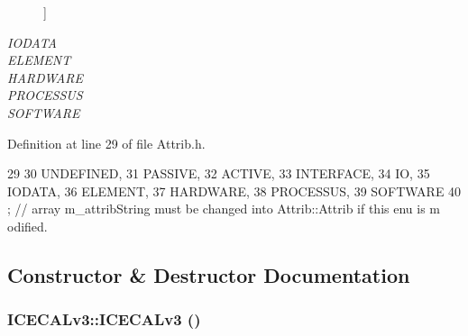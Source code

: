 \begin{Desc}
\begin{description}
{}]\item[{\em 
\hypertarget{classAttrib_a69e171d7cc6417835a5a306d3c764235a0af3b0d0ac323c1704e6c69cf90add28}{
IODATA}
\label{classAttrib_a69e171d7cc6417835a5a306d3c764235a0af3b0d0ac323c1704e6c69cf90add28}
}]\item[{\em 
\hypertarget{classAttrib_a69e171d7cc6417835a5a306d3c764235a7788bc5dd333fd8ce18562b269c9dab1}{
ELEMENT}
\label{classAttrib_a69e171d7cc6417835a5a306d3c764235a7788bc5dd333fd8ce18562b269c9dab1}
}]\item[{\em 
\hypertarget{classAttrib_a69e171d7cc6417835a5a306d3c764235a61ceb22149f365f1780d18f9d1459423}{
HARDWARE}
\label{classAttrib_a69e171d7cc6417835a5a306d3c764235a61ceb22149f365f1780d18f9d1459423}
}]\item[{\em 
\hypertarget{classAttrib_a69e171d7cc6417835a5a306d3c764235a75250e29692496e73effca2c0330977f}{
PROCESSUS}
\label{classAttrib_a69e171d7cc6417835a5a306d3c764235a75250e29692496e73effca2c0330977f}
}]\item[{\em 
\hypertarget{classAttrib_a69e171d7cc6417835a5a306d3c764235a103a67cd0b8f07ef478fa45d4356e27b}{
SOFTWARE}
\label{classAttrib_a69e171d7cc6417835a5a306d3c764235a103a67cd0b8f07ef478fa45d4356e27b}
}]\end{description}
\end{Desc}



Definition at line 29 of file Attrib.h.


\begin{DoxyCode}
29                 {
30     UNDEFINED,
31     PASSIVE,
32     ACTIVE,
33     INTERFACE,
34     IO,
35     IODATA,
36     ELEMENT,
37     HARDWARE,
38     PROCESSUS,
39     SOFTWARE 
40   }; // array m_attribString must be changed into Attrib::Attrib if this enu is m
      odified. 
\end{DoxyCode}


\subsection{Constructor \& Destructor Documentation}
\hypertarget{classICECALv3_a0a8b12d2b6bafca9cd820301fc93dff8}{
\subsubsection[{ICECALv3}]{\setlength{\rightskip}{0pt plus 5cm}ICECALv3::ICECALv3 ()}}
\label{classICECALv3_a0a8b12d2b6bafca9cd820301fc93dff8}


